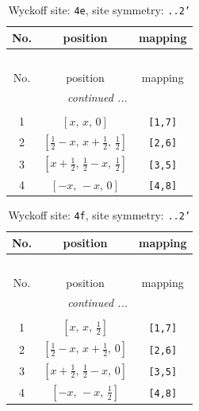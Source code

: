 \documentclass[fleqn,8pt]{jsarticle}
\begin{document}
\renewcommand{\arraystretch}{1.2}
\begin{longtable}{ccc}
\caption{Wyckoff site: {\tt 4e}, site symmetry: {\tt ..2'}}
 \\
 \hline \hline
No. & position & mapping \\ \hline \endfirsthead

\multicolumn{2}{l}{\tablename\ \thetable{}} \\
 \hline \hline
No. & position & mapping \\ \hline \endhead

 \hline \hline
\multicolumn{2}{r}{\footnotesize\it continued ...} \\ \endfoot

 \hline \hline
\multicolumn{2}{r}{} \\ \endlastfoot

1 & $\left[ x,\, x,\, 0 \right]$ & {\tt [1,7]} \\ \hline
2 & $\left[ \frac{1}{2} - x,\, x + \frac{1}{2},\, \frac{1}{2} \right]$ & {\tt [2,6]} \\ \hline
3 & $\left[ x + \frac{1}{2},\, \frac{1}{2} - x,\, \frac{1}{2} \right]$ & {\tt [3,5]} \\ \hline
4 & $\left[ - x,\, - x,\, 0 \right]$ & {\tt [4,8]} \\
\end{longtable}
\renewcommand{\arraystretch}{1.2}
\begin{longtable}{ccc}
\caption{Wyckoff site: {\tt 4f}, site symmetry: {\tt ..2'}}
 \\
 \hline \hline
No. & position & mapping \\ \hline \endfirsthead

\multicolumn{2}{l}{\tablename\ \thetable{}} \\
 \hline \hline
No. & position & mapping \\ \hline \endhead

 \hline \hline
\multicolumn{2}{r}{\footnotesize\it continued ...} \\ \endfoot

 \hline \hline
\multicolumn{2}{r}{} \\ \endlastfoot

1 & $\left[ x,\, x,\, \frac{1}{2} \right]$ & {\tt [1,7]} \\ \hline
2 & $\left[ \frac{1}{2} - x,\, x + \frac{1}{2},\, 0 \right]$ & {\tt [2,6]} \\ \hline
3 & $\left[ x + \frac{1}{2},\, \frac{1}{2} - x,\, 0 \right]$ & {\tt [3,5]} \\ \hline
4 & $\left[ - x,\, - x,\, \frac{1}{2} \right]$ & {\tt [4,8]} \\
\end{longtable}
\end{document}
